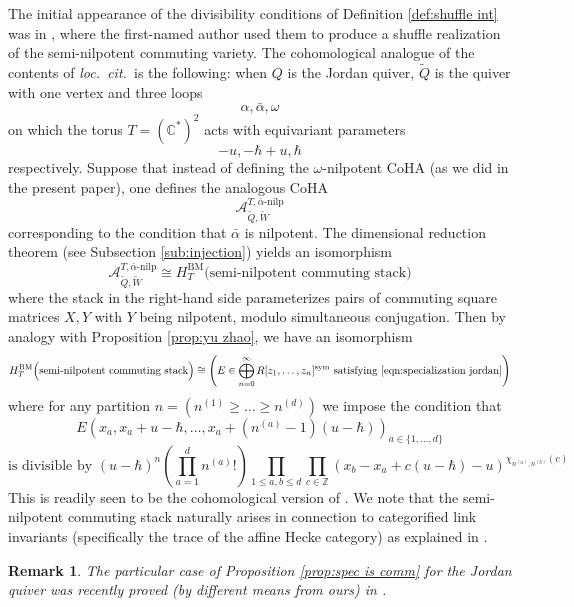 \documentclass{amsart}
\newtheorem{remark}[theorem]{Remark}
\def\BC{{\mathbb{C}}}
\def\BZ{{\mathbb{Z}}}
\def\CA{{\mathcal{A}}}
\def\loccit{\emph{loc.~cit.~}}
\def\dalpha{\bar{\alpha}}
\def\tQ{\tilde{Q}}
\def\tW{\tilde{W}}
\def\ring{R}
\begin{document}
The initial appearance of the divisibility conditions of Definition \ref{def:shuffle int} was in \cite{Integral}, where the first-named author used them to produce a shuffle realization of the semi-nilpotent commuting variety. The cohomological analogue of the contents of \loccit is the following: when $Q$ is the Jordan quiver, $\tQ$ is the quiver with one vertex and three loops
$$
\alpha, \dalpha, \omega
$$
on which the torus $T = (\BC^*)^2$ acts with equivariant parameters
$$
-u, -\hbar+u, \hbar 
$$
respectively. Suppose that instead of defining the $\omega$-nilpotent CoHA (as we did in the present paper), one defines the analogous CoHA
$$
\CA^{T,\dalpha\text{-nilp}}_{\tQ,\tW}
$$
corresponding to the condition that $\dalpha$ is nilpotent. The dimensional reduction theorem (see Subsection \ref{sub:injection}) yields an isomorphism
$$
\CA^{T,\dalpha\text{-nilp}}_{\tQ,\tW} \cong H^{\mathrm{BM}}_T \Big(\text{semi-nilpotent commuting stack} \Big)
$$
where the stack in the right-hand side parameterizes pairs of commuting square matrices $X,Y$ with $Y$ being nilpotent, modulo simultaneous conjugation. Then by analogy with Proposition \ref{prop:yu zhao}, we have an isomorphism
$$
 H^{\mathrm{BM}}_T\Big(\text{semi-nilpotent commuting stack} \Big) \cong \left( E \in \bigoplus_{n = 0}^{\infty} \ring[z_{1},\dots,z_{n}]^{\text{sym}} \text{ satisfying \eqref{eqn:specialization jordan}} \right)
$$
where for any partition $n = (n^{(1)} \geq \dots \geq n^{(d)})$ we impose the condition that
\begin{equation}
\label{eqn:specialization jordan}
E \left(x_{a},x_{a}+ u-\hbar,\dots,x_{a} + (n^{(a)}-1)(u-\hbar) \right)_{a \in \{1,\dots,d\}} 
\end{equation}
$$
\text{is divisible by } (u-\hbar)^{n} \left(  \prod_{a=1}^{d} n^{(a)}! \right)  \prod_{1 \leq a,b \leq d} \prod_{c \in \BZ} \left(x_{b}-x_{a}+c(u-\hbar) - u\right)^{\chi_{n^{(a)},n^{(b)}}(c)}
$$
This is readily seen to be the cohomological version of \cite[Theorem 1.4]{Integral}. We note that the semi-nilpotent commuting stack naturally arises in connection to categorified link invariants (specifically the trace of the affine Hecke category) as explained in \cite{GN1, GN2}. 

\medskip 

\begin{remark}

The particular case of Proposition \ref{prop:spec is comm} for the Jordan quiver was recently proved (by different means from ours) in \cite{H}.
    
\end{remark}

\bigskip


\printbibliography
\end{document}
